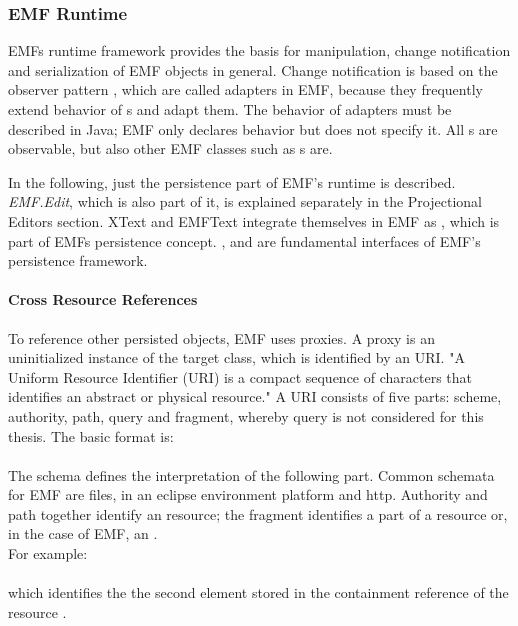 \subsubsection{EMF Runtime}
EMFs runtime framework provides the basis for manipulation, change notification and serialization of EMF objects in general. \cite{EMF2nd} Change notification is based on the observer pattern \cite{patterns}, which are called adapters in EMF, because they frequently extend behavior of s and adapt them. The behavior of adapters must be described in Java; EMF only declares behavior but does not specify it. All s are observable, but also other EMF classes such as s are.

In the following, just the persistence part of EMF's runtime is described. \emph{EMF.Edit}, which is also part of it, is explained separately in the Projectional Editors section. XText \cite{XTextMan} and EMFText \cite{EMFTextMan} integrate themselves in EMF as , which is part of EMFs persistence concept. , and  are fundamental interfaces of EMF's persistence framework.

\paragraph{Cross Resource References}
To reference other persisted objects, EMF uses proxies. A proxy is an uninitialized instance of the target class, which is identified by an URI. "A Uniform Resource Identifier (URI) is a compact sequence of characters that identifies an abstract or physical resource." \cite{URI} A URI consists of five parts: scheme, authority, path, query and fragment, whereby query is not considered for this thesis. The basic format is:\\
 \\
The schema defines the interpretation of the following part. Common schemata for EMF are files, in an eclipse environment platform and http. Authority and path together identify an resource; the fragment identifies a part of a resource or, in the case of EMF, an .\\
For example:\\
\\
which identifies the the second element stored in the containment reference  of the resource .


